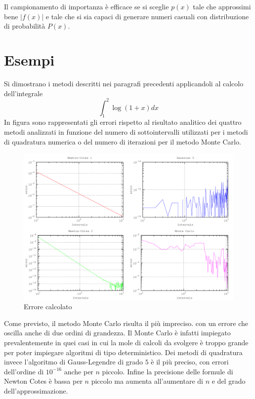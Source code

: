 Il campionamento di importanza è efficace se si sceglie $p(x)$ tale che approssimi bene $|f(x)|$ e tale che si sia capaci di generare numeri casuali con distribuzione di probabilità $P(x)$.

\section{Esempi}
Si dimostrano i metodi descritti nei paragrafi precedenti applicandoli al calcolo dell'integrale $$\int_1^2\log(1+x)dx$$
In figura sono rappresentati gli errori rispetto al risultato analitico dei quattro metodi analizzati in funzione del numero di sottointervalli utilizzati per i metodi di quadratura numerica o del numero di iterazioni per il metodo Monte Carlo.
\begin{figure}[H]
\centering
\includegraphics[width=\textwidth]{integral}
\caption{Errore calcolato}
\label{fig:integral}
\end{figure}

Come previsto, il metodo Monte Carlo risulta il più impreciso. con un errore che oscilla anche di due ordini di grandezza. Il Monte Carlo è infatti impiegato prevalentemente in quei casi in cui la mole di calcoli da svolgere è troppo grande per poter impiegare algoritmi di tipo deterministico.
Dei metodi di quadratura invece l'algoritmo di Gauss-Legendre di grado $5$ è il più preciso, con errori dell'ordine di $10^{-16}$ anche per $n$ piccolo. Infine la precisione delle formule di Newton Cotes è bassa per $n$ piccolo ma aumenta all'aumentare di $n$ e del grado dell'approssimazione.
